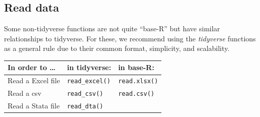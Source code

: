 \documentclass[]{book}
\theoremstyle{definition}
\theoremstyle{definition}
\theoremstyle{definition}
\theoremstyle{remark}
\begin{document}
\hypertarget{read-data}{%
\subsection*{Read data}\label{read-data}}

Some non-tidyverse functions are not quite ``base-R'' but have similar relationships to tidyverse. For these, we recommend using the \emph{tidyverse} functions as a general rule due to their common format, simplicity, and scalability.

\begin{longtable}[]{@{}lll@{}}
\toprule
\begin{minipage}[b]{0.29\columnwidth}\raggedright
In order to \ldots{}\strut
\end{minipage} & \begin{minipage}[b]{0.33\columnwidth}\raggedright
in tidyverse:\strut
\end{minipage} & \begin{minipage}[b]{0.30\columnwidth}\raggedright
in base-R:\strut
\end{minipage}\tabularnewline
\midrule
\endhead
\begin{minipage}[t]{0.29\columnwidth}\raggedright
Read a Excel file\strut
\end{minipage} & \begin{minipage}[t]{0.33\columnwidth}\raggedright
\texttt{read\_excel()}\strut
\end{minipage} & \begin{minipage}[t]{0.30\columnwidth}\raggedright
\texttt{read.xlsx()}\strut
\end{minipage}\tabularnewline
\begin{minipage}[t]{0.29\columnwidth}\raggedright
Read a csv\strut
\end{minipage} & \begin{minipage}[t]{0.33\columnwidth}\raggedright
\texttt{read\_csv()}\strut
\end{minipage} & \begin{minipage}[t]{0.30\columnwidth}\raggedright
\texttt{read.csv()}\strut
\end{minipage}\tabularnewline
\begin{minipage}[t]{0.29\columnwidth}\raggedright
Read a Stata file\strut
\end{minipage} & \begin{minipage}[t]{0.33\columnwidth}\raggedright
\texttt{read\_dta()}\strut
\end{minipage} & \begin{minipage}[t]{0.30\columnwidth}\raggedright

\end{minipage}
\end{longtable}
\end{document}
